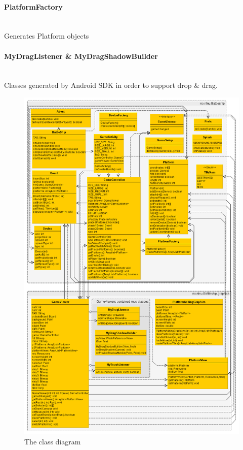 \documentclass[12pt, a4paper]{article}
\begin{document}
\paragraph{PlatformFactory} ~\\
	Generates Platform objects

\paragraph{MyDragListener \& MyDragShadowBuilder} ~\\
	Classes generated by Android SDK in order to support drop \& drag.

\begin{figure}[h!]
    \centering
    \includegraphics[width=.9\textwidth]{classdiagram} 
    \caption{The class diagram}
    \label{fig:classdiagram}
\end{figure}
\end{document}
